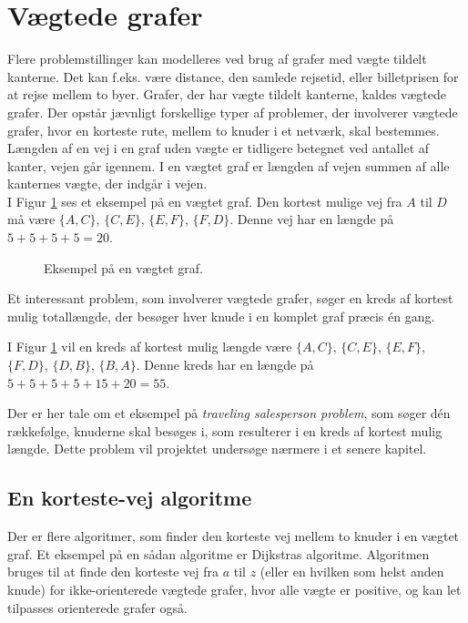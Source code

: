 \section{Vægtede grafer}

Flere problemstillinger kan modelleres ved brug af grafer med vægte tildelt kanterne. 
Det kan f.eks. være distance, den samlede rejsetid, eller billetprisen for at rejse mellem to byer. 
Grafer, der har vægte tildelt kanterne, kaldes vægtede grafer. 
Der opstår jævnligt forskellige typer af problemer, der involverer vægtede grafer, hvor en korteste rute, mellem to knuder i et netværk, skal bestemmes. 
Længden af en vej i en graf uden vægte er tidligere betegnet ved antallet af kanter, vejen går igennem.
I en vægtet graf er længden af vejen summen af alle kanternes vægte, der indgår i vejen. \\
I Figur \ref{fig:weighted_graph} ses et eksempel på en vægtet graf. Den kortest mulige vej fra $A$ til $D$ må være $\lbrace A,C \rbrace$, $\lbrace C,E \rbrace$, $\lbrace E,F \rbrace$, $\lbrace F,D \rbrace$. Denne vej har en længde på $5+5+5+5=20$. 

\begin{figure}[h!]
	\centering
	
	\caption{Eksempel på en vægtet graf.} \label{fig:weighted_graph}
\end{figure}

Et interessant problem, som involverer vægtede grafer, søger en kreds af kortest mulig totallængde, der besøger hver knude i en komplet graf præcis én gang.

I Figur \ref{fig:weighted_graph} vil en kreds af kortest mulig længde være $\lbrace A,C \rbrace$, $\lbrace C,E \rbrace$, $\lbrace E,F \rbrace$, $\lbrace F,D \rbrace$, $\lbrace D,B \rbrace$, $\lbrace B,A \rbrace$.
Denne kreds har en længde på $5+5+5+5+15+20=55$.

Der er her tale om et eksempel på \emph{traveling salesperson problem}, som søger dén rækkefølge, knuderne skal besøges i, som resulterer i en kreds af kortest mulig længde. 
Dette problem vil projektet undersøge nærmere i et senere kapitel.

\subsection{En korteste-vej algoritme}
Der er flere algoritmer, som finder den korteste vej mellem to knuder i en vægtet graf.
Et eksempel på en sådan algoritme er Dijkstras algoritme.
Algoritmen bruges til at finde den korteste vej fra $a$ til $z$ (eller en hvilken som helst anden knude) for ikke-orienterede vægtede grafer, hvor alle vægte er positive, og kan let tilpasses orienterede grafer også.

